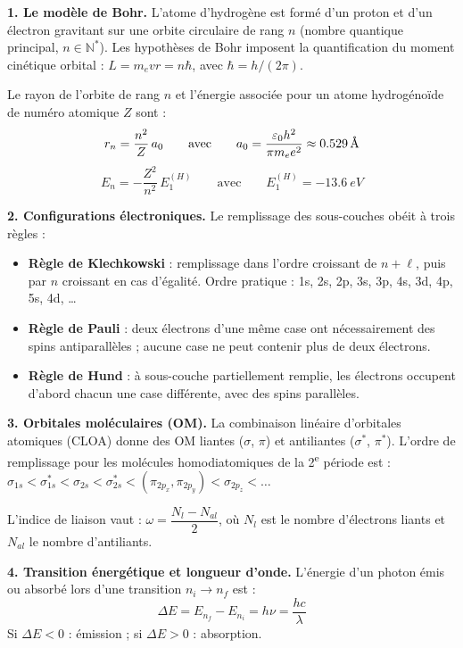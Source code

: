 \documentclass[12pt,a4paper]{article}
\begin{document}
\begin{boiteresume}

\textbf{1. Le modèle de Bohr.} L'atome d'hydrogène est formé d'un proton et d'un électron gravitant sur une orbite circulaire de rang $n$ (nombre quantique principal, $n \in \mathbb{N}^*$). Les hypothèses de Bohr imposent la quantification du moment cinétique orbital : $L = m_e v r = n\hbar$, avec $\hbar = h/(2\pi)$.

Le rayon de l'orbite de rang $n$ et l'énergie associée pour un atome hydrogénoïde de numéro atomique $Z$ sont :
\[
r_n = \frac{n^2}{Z}\,a_0 \qquad \text{avec} \qquad a_0 = \frac{\varepsilon_0 h^2}{\pi m_e e^2} \approx \num{0.529}\,\text{\AA}
\]
\[
E_n = -\frac{Z^2}{n^2}\,E_1^{(H)} \qquad \text{avec} \qquad E_1^{(H)} = \qty{-13.6}{eV}
\]

\textbf{2. Configurations électroniques.} Le remplissage des sous-couches obéit à trois règles :
\begin{itemize}[nosep]
  \item \textbf{Règle de Klechkowski} : remplissage dans l'ordre croissant de $n+\ell$, puis par $n$ croissant en cas d'égalité. Ordre pratique : 1s, 2s, 2p, 3s, 3p, 4s, 3d, 4p, 5s, 4d, \dots
  \item \textbf{Règle de Pauli} : deux électrons d'une même case ont nécessairement des spins antiparallèles ; aucune case ne peut contenir plus de deux électrons.
  \item \textbf{Règle de Hund} : à sous-couche partiellement remplie, les électrons occupent d'abord chacun une case différente, avec des spins parallèles.
\end{itemize}

\textbf{3. Orbitales moléculaires (OM).} La combinaison linéaire d'orbitales atomiques (CLOA) donne des OM liantes ($\sigma$, $\pi$) et antiliantes ($\sigma^*$, $\pi^*$). L'ordre de remplissage pour les molécules homodiatomiques de la 2\textsuperscript{e} période est :
$\sigma_{1s} < \sigma^*_{1s} < \sigma_{2s} < \sigma^*_{2s} < (\pi_{2p_x}, \pi_{2p_y}) < \sigma_{2p_z} < \dots$

L'indice de liaison vaut : $\omega = \dfrac{N_l - N_{al}}{2}$, où $N_l$ est le nombre d'électrons liants et $N_{al}$ le nombre d'antiliants.

\textbf{4. Transition énergétique et longueur d'onde.} L'énergie d'un photon émis ou absorbé lors d'une transition $n_i \to n_f$ est :
\[
\Delta E = E_{n_f} - E_{n_i} = h\nu = \frac{hc}{\lambda}
\]
Si $\Delta E < 0$ : émission ; si $\Delta E > 0$ : absorption.

\end{boiteresume}
\end{document}
